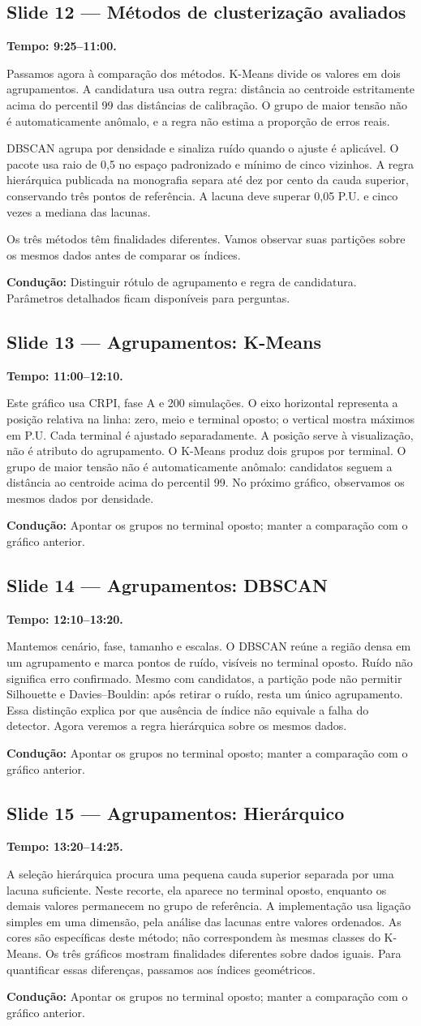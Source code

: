 \documentclass[11pt,a4paper]{article}
\newcommand{\slide}[3]{\Needspace{8\baselineskip}
  \subsection*{Slide #1 --- #2}
  \textbf{Tempo: #3.}\par}
\newcommand{\cue}[1]{\par{\small\color{accent}\textbf{Condução:} #1}\par}
\begin{document}
\slide{12}{Métodos de clusterização avaliados}{9:25--11:00}
Passamos agora à comparação dos métodos. K-Means divide os valores em dois agrupamentos. A candidatura usa outra regra: distância ao centroide estritamente acima do percentil 99 das distâncias de calibração. O grupo de maior tensão não é automaticamente anômalo, e a regra não estima a proporção de erros reais.

DBSCAN agrupa por densidade e sinaliza ruído quando o ajuste é aplicável. O pacote usa raio de 0,5 no espaço padronizado e mínimo de cinco vizinhos. A regra hierárquica publicada na monografia separa até dez por cento da cauda superior, conservando três pontos de referência. A lacuna deve superar 0,05 P.U. e cinco vezes a mediana das lacunas.

Os três métodos têm finalidades diferentes. Vamos observar suas partições sobre os mesmos dados antes de comparar os índices.
\cue{Distinguir rótulo de agrupamento e regra de candidatura. Parâmetros detalhados ficam disponíveis para perguntas.}


\slide{13}{Agrupamentos: K-Means}{11:00--12:10}
Este gráfico usa CRPI, fase A e 200 simulações. O eixo horizontal representa a posição relativa na linha: zero, meio e terminal oposto; o vertical mostra máximos em P.U. Cada terminal é ajustado separadamente. A posição serve à visualização, não é atributo do agrupamento. O K-Means produz dois grupos por terminal. O grupo de maior tensão não é automaticamente anômalo: candidatos seguem a distância ao centroide acima do percentil 99. No próximo gráfico, observamos os mesmos dados por densidade.
\cue{Apontar os grupos no terminal oposto; manter a comparação com o gráfico anterior.}

\slide{14}{Agrupamentos: DBSCAN}{12:10--13:20}
Mantemos cenário, fase, tamanho e escalas. O DBSCAN reúne a região densa em um agrupamento e marca pontos de ruído, visíveis no terminal oposto. Ruído não significa erro confirmado. Mesmo com candidatos, a partição pode não permitir Silhouette e Davies--Bouldin: após retirar o ruído, resta um único agrupamento. Essa distinção explica por que ausência de índice não equivale a falha do detector. Agora veremos a regra hierárquica sobre os mesmos dados.
\cue{Apontar os grupos no terminal oposto; manter a comparação com o gráfico anterior.}

\slide{15}{Agrupamentos: Hierárquico}{13:20--14:25}
A seleção hierárquica procura uma pequena cauda superior separada por uma lacuna suficiente. Neste recorte, ela aparece no terminal oposto, enquanto os demais valores permanecem no grupo de referência. A implementação usa ligação simples em uma dimensão, pela análise das lacunas entre valores ordenados. As cores são específicas deste método; não correspondem às mesmas classes do K-Means. Os três gráficos mostram finalidades diferentes sobre dados iguais. Para quantificar essas diferenças, passamos aos índices geométricos.
\cue{Apontar os grupos no terminal oposto; manter a comparação com o gráfico anterior.}
\end{document}
